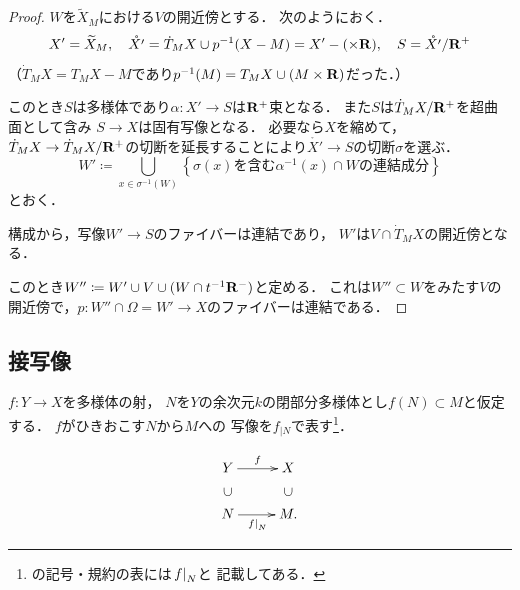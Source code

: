 \begin{proof}
    \(W\)を\(\widetilde{X}_M\)における\(V\)の開近傍とする．
    次のようにおく．
    \[
        X'=\widetilde{X}_M,\quad
        \mathring{X'}
        =\dot{T}_{M}X\cup p^{-1}(X-M)
        =X'-(\times\rr),\quad
        S=\mathring{X'}/\rr^{+}
    \]
    （\(\dot{T}_{M}X=T_{M}X-M\)であり\(
        p^{-1}(M)=T_{M}X\cup(M\times \rr)
    \)だった．）

    このとき\(S\)は多様体であり\(
        \alpha\colon X'\to S
    \)は\(\rr^+\)束となる．
    また\(S\)は\(\dot{T}_{M}X/\rr^{+}\)を超曲面として含み
    \(S\to X\)は固有写像となる．
    必要なら\(X\)を縮めて，\(\dot{T}_{M}X\to\dot{T}_{M}X/\rr^{+}\)の切断を延長することにより\(\mathring{X'}\to S\)の切断\(\sigma\)を選ぶ．
    \[
        W'\coloneqq\bigcup_{x\in\sigma^{-1}(W)}\left\{
            \text{\(\sigma(x)\)を含む\(\alpha^{-1}(x)\cap W\)の連結成分}
        \right\}
    \]
    とおく．

    構成から，写像\(W'\to S\)のファイバーは連結であり，
    \(W'\)は\(V\cap \dot{T}_{M}X\)の開近傍となる．

    このとき\(W''\coloneqq W'\cup V\cup (W\cap t^{-1}\rr^{-})\)と定める．
    これは\(W''\subset W\)をみたす\(V\)の開近傍で，\(
        p\colon W''\cap \varOmega=W'\to X
    \)のファイバーは連結である．
\end{proof}

\subsection*{接写像}
\(f\colon Y\to X\)を多様体の射，
\(N\)を\(Y\)の余次元\(k\)の閉部分多様体とし\(
    f(N)\subset M
\)と仮定する．
\(f\)がひきおこす\(N\)から\(M\)への
写像を\(f_{|N}\)で表す\footnote{
    \cite[p.503]{KS90}の記号・規約の表には\(\mres[f]{N}\)と
    記載してある．
}．

\[
    \vcenter{\xymatrix@C=26pt@R=20pt{
    Y
    \ar[r]^-{f}
    &
    X
    \\
    N
    \ar@{}[u]|{\rotatebox{90}{\(\subset\)}}
    \ar[r]_-{\mres[f]{N}}
    &
    \ar@{}[u]|{\rotatebox{90}{\(\subset\)}}
    M.
  }}
\]

